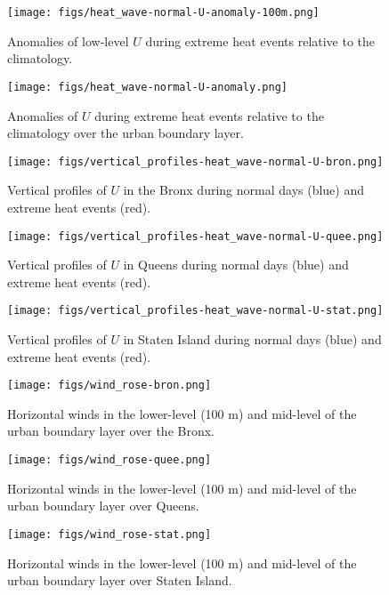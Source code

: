 \documentclass[num-refs]{wiley-article}
\begin{document}
\begin{figure}[ht]
	\centering
	\texttt{[image: figs/heat\_wave-normal-U-anomaly-100m.png]}
	\caption{Anomalies of low-level $U$ during extreme heat events relative to the climatology.}
	\label{fig:extreme-heat-normal-100m-comparison-U}
\end{figure}
\begin{figure}[ht]
	\centering
	\texttt{[image: figs/heat\_wave-normal-U-anomaly.png]}
	\caption{Anomalies of $U$ during extreme heat events relative to the climatology over the urban boundary layer.}
	\label{fig:extreme-heat-normal-comparison-contours-U}
\end{figure}
\begin{figure}[ht]
	\centering
	\texttt{[image: figs/vertical\_profiles-heat\_wave-normal-U-bron.png]}
	\caption{Vertical profiles of $U$ in the Bronx during normal days (blue) and extreme heat events (red).}
	\label{fig:vertical_profiles-heat_wave-normal-U-bron}
\end{figure}
\begin{figure}[ht]
	\centering
	\texttt{[image: figs/vertical\_profiles-heat\_wave-normal-U-quee.png]}
	\caption{Vertical profiles of $U$ in Queens during normal days (blue) and extreme heat events (red).}
	\label{fig:vertical_profiles-heat_wave-normal-U-quee}
\end{figure}
\begin{figure}[ht]
	\centering
	\texttt{[image: figs/vertical\_profiles-heat\_wave-normal-U-stat.png]}
	\caption{Vertical profiles of $U$ in Staten Island during normal days (blue) and extreme heat events (red).}
	\label{fig:vertical_profiles-heat_wave-normal-U-stat}
\end{figure}

\begin{figure}[ht]
	\centering
	\texttt{[image: figs/wind\_rose-bron.png]}
	\caption{Horizontal winds in the lower-level (100 m) and mid-level of the urban boundary layer over the Bronx.}
	\label{fig:wind_rose-bron}
\end{figure}
\begin{figure}[ht]
	\centering
	\texttt{[image: figs/wind\_rose-quee.png]}
	\caption{Horizontal winds in the lower-level (100 m) and mid-level of the urban boundary layer over Queens.}
	\label{fig:wind_rose-quee}
\end{figure}
\begin{figure}[ht]
	\centering
	\texttt{[image: figs/wind\_rose-stat.png]}
	\caption{Horizontal winds in the lower-level (100 m) and mid-level of the urban boundary layer over Staten Island.}
	\label{fig:wind_rose-stat}
\end{figure}
\end{document}
